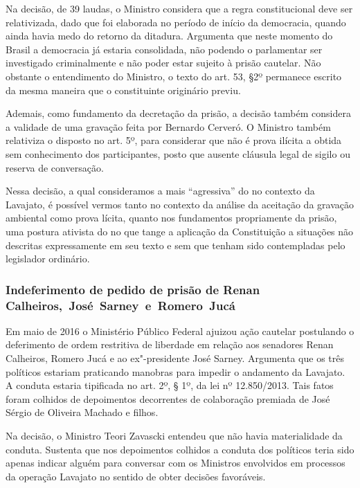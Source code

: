 Na decisão, de 39 laudas, o Ministro considera que a regra
constitucional deve ser relativizada, dado que foi elaborada no período
de início da democracia, quando ainda havia medo do retorno da ditadura.
Argumenta que neste momento do Brasil a democracia já estaria
consolidada, não podendo o parlamentar ser investigado criminalmente e
não poder estar sujeito à prisão cautelar. Não obstante o entendimento
do Ministro, o texto do art. 53, §2º permanece escrito da mesma maneira
que o constituinte originário previu.

Ademais, como fundamento da decretação da prisão, a decisão também
considera a validade de uma gravação feita por Bernardo Cerveró. O
Ministro também relativiza o disposto no art. 5º,  para considerar
que não é prova ilícita a obtida sem conhecimento dos participantes,
posto que ausente cláusula legal de sigilo ou reserva de conversação.

Nessa decisão, a qual consideramos a mais ``agressiva'' do  no
contexto da Lavajato, é possível vermos tanto no contexto da análise da
aceitação da gravação ambiental como prova lícita, quanto nos
fundamentos propriamente da prisão, uma postura ativista do  no que
tange a aplicação da Constituição a situações não descritas
expressamente em seu texto e sem que tenham sido contempladas pelo
legislador ordinário.

\subsubsection{Indeferimento de pedido de prisão de Renan Calheiros,~José~Sarney~e~Romero~Jucá}

Em maio de 2016 o Ministério Público Federal ajuizou ação cautelar
postulando o deferimento de ordem restritiva de liberdade em relação aos
senadores Renan Calheiros, Romero Jucá e ao ex"-presidente José Sarney.
Argumenta que os três políticos estariam praticando manobras para
impedir o andamento da Lavajato. A conduta estaria tipificada no art.
2º, § 1º, da lei nº 12.850/2013. Tais fatos foram colhidos de
depoimentos decorrentes de colaboração premiada de José Sérgio de
Oliveira Machado e filhos.

Na decisão, o Ministro Teori Zavascki entendeu que não havia
materialidade da conduta. Sustenta que nos depoimentos colhidos a
conduta dos políticos teria sido apenas indicar alguém para conversar
com os Ministros envolvidos em processos da operação Lavajato no
sentido de obter decisões favoráveis.

